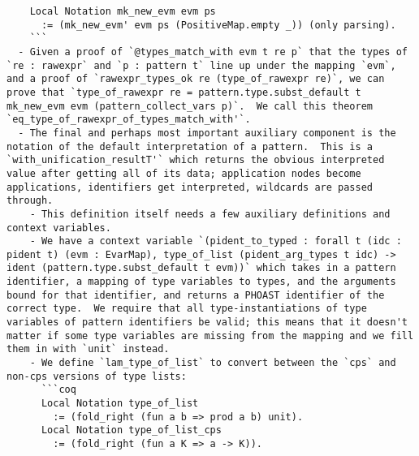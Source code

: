 \begin{itemize}
\begin{verbatim}
    Local Notation mk_new_evm evm ps
      := (mk_new_evm' evm ps (PositiveMap.empty _)) (only parsing).
    ```
  - Given a proof of `@types_match_with evm t re p` that the types of `re : rawexpr` and `p : pattern t` line up under the mapping `evm`, and a proof of `rawexpr_types_ok re (type_of_rawexpr re)`, we can prove that `type_of_rawexpr re = pattern.type.subst_default t mk_new_evm evm (pattern_collect_vars p)`.  We call this theorem `eq_type_of_rawexpr_of_types_match_with'`.
  - The final and perhaps most important auxiliary component is the notation of the default interpretation of a pattern.  This is a `with_unification_resultT'` which returns the obvious interpreted value after getting all of its data; application nodes become applications, identifiers get interpreted, wildcards are passed through.
    - This definition itself needs a few auxiliary definitions and context variables.
    - We have a context variable `(pident_to_typed : forall t (idc : pident t) (evm : EvarMap), type_of_list (pident_arg_types t idc) -> ident (pattern.type.subst_default t evm))` which takes in a pattern identifier, a mapping of type variables to types, and the arguments bound for that identifier, and returns a PHOAST identifier of the correct type.  We require that all type-instantiations of type variables of pattern identifiers be valid; this means that it doesn't matter if some type variables are missing from the mapping and we fill them in with `unit` instead.
    - We define `lam_type_of_list` to convert between the `cps` and non-cps versions of type lists:
      ```coq
      Local Notation type_of_list
        := (fold_right (fun a b => prod a b) unit).
      Local Notation type_of_list_cps
        := (fold_right (fun a K => a -> K)).


\end{verbatim}
\end{itemize}
